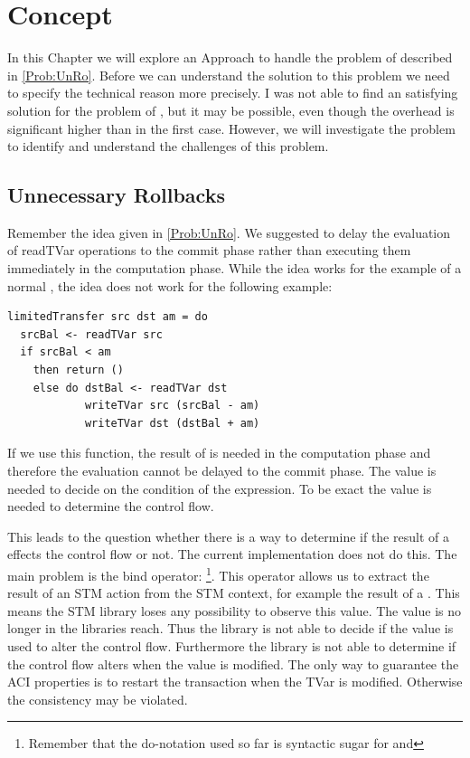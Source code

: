 
\chapter{Concept} %

\label{Chapter2} %

In this Chapter we will explore an Approach to handle the problem of  described in \ref{Prob:UnRo}.
Before we can understand the solution to this problem we need to specify the technical reason more precisely. 
I was not able to find an satisfying solution for the problem of , but it may 
be possible, even though the overhead is significant higher than in the first case. However, we will investigate 
the problem to identify and understand the challenges of this problem.

\section{Unnecessary Rollbacks}
Remember the idea given in \ref{Prob:UnRo}. We suggested to delay the evaluation of 
readTVar operations to the commit phase rather than executing them immediately in the computation
phase. While the idea works for the example of a normal , the idea does not work 
for the following example:
\begin{lstlisting}
limitedTransfer src dst am = do 
  srcBal <- readTVar src
  if srcBal < am
    then return ()
    else do dstBal <- readTVar dst
            writeTVar src (srcBal - am)
            writeTVar dst (dstBal + am)
\end{lstlisting}
If we use this function, the result of  is needed in the computation phase and therefore 
the evaluation cannot be delayed to the commit phase. The value is needed to decide on the condition of the 
 expression. To be exact the value is needed to determine the control flow. 

This leads to the question whether there is a way to determine if the result of a  effects the 
control flow or not. The current implementation does not do this. The main problem is the bind
operator: \footnote{Remember that the do-notation used so far is 
syntactic sugar for \code{>>=} and \code{>>}}. This operator allows us to extract the result of an STM action 
from the STM context, for example the result of a . This means the STM library loses any possibility to 
observe this value. The value is no longer in the libraries reach. Thus the library is not able to decide if 
the value is used to alter the control flow. Furthermore the library is not able to determine if the control
flow alters when the value is modified. The only way to guarantee the ACI properties is to restart the 
transaction when the TVar is modified. Otherwise the consistency may be violated.

